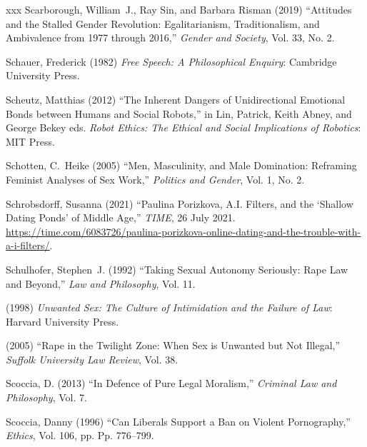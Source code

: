 \documentclass[]{jlreq} \usepackage{mystyle}
\begin{document}
\begin{thebibliography}{xxx}
Scarborough, William~J., Ray Sin, and Barbara Risman (2019) ``Attitudes and the
  Stalled Gender Revolution: Egalitarianism, Traditionalism, and Ambivalence
  from 1977 through 2016,'' \textit{ Gender and Society}, Vol. 33, No. 2.

Schauer, Frederick (1982)  \textit{ Free Speech: A Philosophical Enquiry}:
  Cambridge University Press.

Scheutz, Matthias (2012) ``The Inherent Dangers of Unidirectional Emotional
  Bonds between Humans and Social Robots,'' in Lin, Patrick, Keith Abney, and
  George Bekey eds.   \textit{ Robot Ethics: The Ethical and Social
  Implications of Robotics}: MIT Press.

Schotten, C.~Heike (2005) ``Men, Masculinity, and Male Domination: Reframing
  Feminist Analyses of Sex Work,'' \textit{ Politics and Gender}, Vol. 1, No.
  2.

Schrobsdorff, Susanna (2021) ``Paulina Porizkova, A.I. Filters, and the
  `Shallow Dating Ponds' of Middle Age,'' \emph{TIME}, 26 July 2021.
  \url{https://time.com/6083726/paulina-porizkova-online-dating-and-the-trouble-with-a-i-filters/}.

Schulhofer, Stephen~J. (1992) ``Taking Sexual Autonomy Seriously: Rape Law and
  Beyond,'' \textit{ Law and Philosophy}, Vol. 11.

 \bysame{}  (1998)  \textit{ Unwanted Sex: The Culture of Intimidation and the
  Failure of Law}: Harvard University Press.

 \bysame{}  (2005) ``Rape in the Twilight Zone: When Sex is Unwanted but Not
  Illegal,'' \textit{ Suffolk University Law Review}, Vol. 38.

Scoccia, D. (2013) ``In Defence of Pure Legal Moralism,'' \textit{ Criminal Law
  and Philosophy}, Vol. 7.

Scoccia, Danny (1996) ``Can Liberals Support a Ban on Violent Pornography,''
  \textit{ Ethics}, Vol. 106, pp. Pp. 776--799.


\end{thebibliography}
\end{document}
